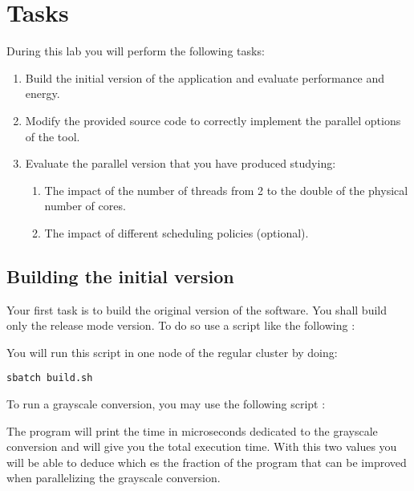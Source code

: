 \section{Tasks}

During this lab you will perform the following tasks:

\begin{enumerate}

\item Build the initial version of the application and evaluate performance and
energy.

\item Modify the provided source code to correctly implement the parallel
options of the tool.

\item Evaluate the parallel version that you have produced studying:

\begin{enumerate}
  \item The impact of the number of threads from 2 to the double of the physical
number of cores.
  \item The impact of different scheduling policies (optional). 
\end{enumerate}

\end{enumerate}

\subsection{Building the initial version}

Your first task is to build the original version of the software. You shall
build only the release mode version. To do so use a script like the following
:



You will run this script in one node of the regular cluster by doing:

\begin{lstlisting}[style=terminal]
sbatch build.sh
\end{lstlisting}

To run a grayscale conversion, you may use the following script
:



The program will print the time in microseconds dedicated to the grayscale
conversion and  will give you the total execution time.
With this two values you will be able to deduce which es the fraction of the
program that can be improved when parallelizing the grayscale conversion.

